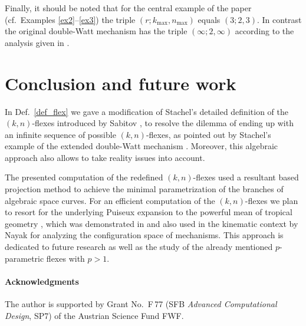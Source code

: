 \documentclass{svproc}
\begin{document}
Finally, it should be noted that for the central example of the paper (cf.\ Examples \ref{ex2}--\ref{ex3}) the triple $(r;k_{\max},n_{\max})$ equals $(3;2,3)$. In contrast the original double-Watt mechanism has the triple $(\infty;2,\infty)$ according to the analysis given in \cite{servatius,gaspar,muller,MMT,nayak,stachel_proposal}.


\section{Conclusion and future work}

In Def.\ \ref{def_flex}  we gave a modification of Stachel's detailed definition of the $(k,n)$-flexes \cite{stachel_proposal} introduced by Sabitov \cite{sabitov},
to resolve the dilemma of ending up with an infinite sequence of possible 
$(k,n)$-flexes, as pointed out by Stachel's example of the extended double-Watt mechanism \cite{stachel_aim}. 
Moreover, this algebraic approach also allows to take reality issues into account.

The presented computation of the redefined 
$(k,n)$-flexes used a resultant based projection method  \cite{melanova} to achieve the minimal parametrization
of the branches of algebraic space curves.  
For an efficient computation of the $(k,n)$-flexes we plan to resort for the underlying Puiseux expansion to the powerful mean of tropical geometry \cite{maclagan}, which was demonstrated in \cite{jensen} and also used in the kinematic context by Nayak \cite{nayak} for analyzing the configuration space of mechanisms. This approach is dedicated to future research as well as the study of the already mentioned  $p$-parametric flexes with $p>1$.





\paragraph{{\bf Acknowledgments}}
The author is supported by Grant No.\ F\,77 (SFB {\it Advanced Computational Design}, SP7) of the Austrian Science Fund FWF. 
\end{document}
